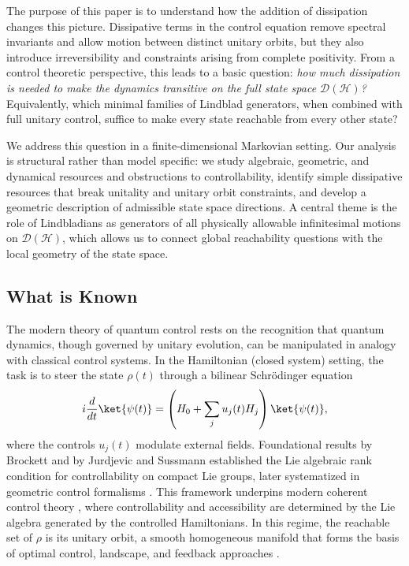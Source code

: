 \documentclass[11pt,reqno]{amsart}
\theoremstyle{definition}
\newcommand{\mc}{\mathcal}
\newcommand{\lpara}{\left(}
\newcommand{\rpara}{\right)}
\begin{document}
The purpose of this paper is to understand how the addition of dissipation changes this picture.  
Dissipative terms in the control equation remove spectral invariants and allow motion between distinct unitary orbits, but they also introduce irreversibility and constraints arising from complete positivity.  
From a control theoretic perspective, this leads to a basic question: \emph{how much dissipation is needed to make the dynamics transitive on the full state space $\mc D(\mc H)$?}  
Equivalently, which minimal families of Lindblad generators, when combined with full unitary control, suffice to make every state reachable from every other state?

We address this question in a finite-dimensional Markovian setting.  
Our analysis is structural rather than model specific: we study algebraic, geometric, and dynamical resources and obstructions to controllability, identify simple dissipative resources that break unitality and unitary orbit constraints, and develop a geometric description of admissible state space directions.  
A central theme is the role of Lindbladians as generators of all physically allowable infinitesimal motions on $\mc D(\mc H)$, which allows us to connect global reachability questions with the local geometry of the state space.

\subsection{What is Known}
The modern theory of quantum control rests on the recognition that quantum dynamics, though governed by unitary evolution, can be manipulated in analogy with classical control systems.  
In the Hamiltonian (closed system) setting, the task is to steer the state $\rho(t)$ through a bilinear Schrödinger equation
\begin{equation}
  i\frac{d}{dt}\ket{\psi(t)} = \lpara H_0 + \sum_j u_j(t) H_j\rpara \ket{\psi(t)},
\end{equation}
where the controls $u_j(t)$ modulate external fields.  
Foundational results by Brockett \cite{brockett1972,brockett1977} and by Jurdjevic and Sussmann \cite{jurdjevic1972} established the Lie algebraic rank condition for controllability on compact Lie groups, later systematized in geometric control formalisms \cite{isidori1985,zabczyk2020}.  
This framework underpins modern coherent control theory \cite{dalessandro2021,nielsen2010}, where controllability and accessibility are determined by the Lie algebra generated by the controlled Hamiltonians.  
In this regime, the reachable set of $\rho$ is its unitary orbit, a smooth homogeneous manifold that forms the basis of optimal control, landscape, and feedback approaches \cite{khaneja2001,brif2010,chakrabarti2007,glaser2015,wiseman2009,mirrahimi2004,mirrahimi2005}.
\end{document}
